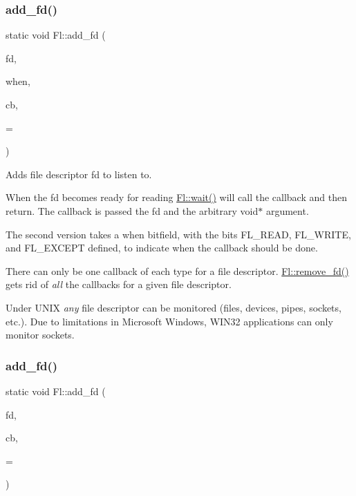 \mbox{\label{class_fl_a799b8278326b3c2db15687c43c11aaf6}} 
\subsubsection{\texorpdfstring{add\+\_\+fd()}{add\_fd()}\hspace{0.1cm}{\footnotesize\ttfamily [1/2]}}
{\footnotesize\ttfamily static void Fl\+::add\+\_\+fd (\begin{DoxyParamCaption}\item[{int}]{fd,  }\item[{int}]{when,  }\item[{\hyperlink{group__callback__functions_ga2cff1a51089da7653ab49bae499dfbf4}{Fl\+\_\+\+F\+D\+\_\+\+Handler}}]{cb,  }\item[{void $\ast$}]{ = {} }\end{DoxyParamCaption})\hspace{0.3cm}{\ttfamily [static]}}

Adds file descriptor fd to listen to.

When the fd becomes ready for reading \hyperlink{class_fl_a60da08d5496f625769828d4b71614ab0}{Fl\+::wait()} will call the callback and then return. The callback is passed the fd and the arbitrary void$\ast$ argument.

The second version takes a when bitfield, with the bits F\+L\+\_\+\+R\+E\+AD, F\+L\+\_\+\+W\+R\+I\+TE, and F\+L\+\_\+\+E\+X\+C\+E\+PT defined, to indicate when the callback should be done.

There can only be one callback of each type for a file descriptor. \hyperlink{class_fl_a1c7766bf3e45e170fe1741e98092e55f}{Fl\+::remove\+\_\+fd()} gets rid of {\itshape all} the callbacks for a given file descriptor.

Under U\+N\+IX {\itshape any} file descriptor can be monitored (files, devices, pipes, sockets, etc.). Due to limitations in Microsoft Windows, W\+I\+N32 applications can only monitor sockets. \mbox{\label{class_fl_ad45d81e99587aa6115cb8a6b3d757517}} 
\subsubsection{\texorpdfstring{add\+\_\+fd()}{add\_fd()}\hspace{0.1cm}{\footnotesize\ttfamily [2/2]}}
{\footnotesize\ttfamily static void Fl\+::add\+\_\+fd (\begin{DoxyParamCaption}\item[{int}]{fd,  }\item[{\hyperlink{group__callback__functions_ga2cff1a51089da7653ab49bae499dfbf4}{Fl\+\_\+\+F\+D\+\_\+\+Handler}}]{cb,  }\item[{void $\ast$}]{ = {} }\end{DoxyParamCaption})\hspace{0.3cm}{\ttfamily [static]}}

